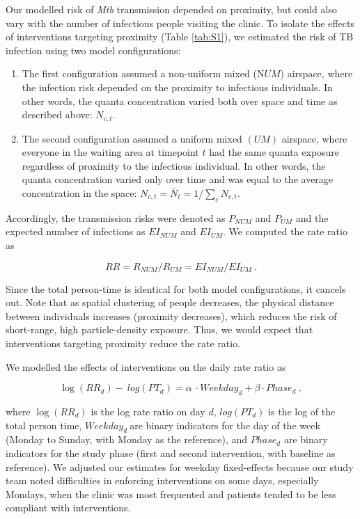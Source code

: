 \documentclass[11pt]{article}
\begin{document}
Our modelled risk of \emph{Mtb} transmission depended on proximity, but could also vary with the number of infectious people visiting the clinic. To isolate the effects of interventions targeting proximity (Table \ref{tab:S1}), we estimated the risk of TB infection using two model configurations:

\begin{enumerate}
\def\labelenumi{\arabic{enumi}.}
\item
  The first configuration assumed a non-uniform mixed (N\(UM\)) airspace, where the infection risk depended on the proximity to infectious individuals. In other words, the quanta concentration varied both over space and time as described above: \(N_{c,t}\).
\item
  The second configuration assumed a uniform mixed \((UM)\) airspace, where everyone in the waiting area at timepoint \(t\) had the same quanta exposure regardless of proximity to the infectious individual. In other words, the quanta concentration varied only over time and was equal to the average concentration in the space: \(N_{c,t} = {\bar{N}}_{t} = 1/\sum_{c}^{}{}N_{c,t}\).
\end{enumerate}

Accordingly, the transmission risks were denoted as \(P_{NUM}\) and \(P_{UM}\) and the expected number of infections as \({EI}_{NUM}\) and \({EI}_{UM}\). We computed the rate ratio as

\[RR = R_{NUM}/R_{UM} = EI_{NUM}/EI_{UM}~.\]

Since the total person-time is identical for both model configurations, it cancels out. Note that as spatial clustering of people decreases, the physical distance between individuals increases (proximity decreases), which reduces the risk of short-range, high particle-density exposure. Thus, we would expect that interventions targeting proximity reduce the rate ratio.

We modelled the effects of interventions on the daily rate ratio as

\[\log(RR_{d}) - \ log(PT_{d}) = \alpha\  \cdot Weekday_{d} + \beta \cdot Phase_{d}~,\]

where \(\log(RR_{d})\) is the log rate ratio on day \(d\), \(log(PT_{d})\) is the log of the total person time, \(Weekday_{d}\ \)are binary indicators for the day of the week (Monday to Sunday, with Monday as the reference), and \(Phase_{d}\) are binary indicators for the study phase (first and second intervention, with baseline as reference). We adjusted our estimates for weekday fixed-effects because our study team noted difficulties in enforcing interventions on some days, especially Mondays, when the clinic was most frequented and patients tended to be less compliant with interventions.
\end{document}

